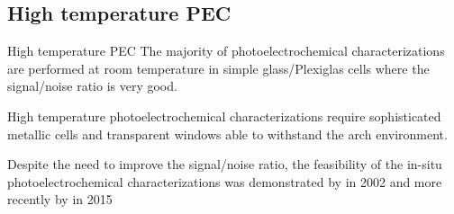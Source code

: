 \documentclass[10pt,compress,handout]{beamer}
\begin{document}
\subsection{High temperature PEC}
    \begin{frame}[allowframebreaks=1.0]{High temperature PEC}
        The majority of photoelectrochemical characterizations are performed at 
        room temperature in simple glass/Plexiglas cells where the signal/noise 
        ratio is very good.
        
        High temperature photoelectrochemical characterizations 
        require sophisticated metallic cells and transparent windows 
        able to withstand the arch environment. 
        
        Despite the need to improve the signal/noise ratio, the feasibility of 
        the in-situ photoelectrochemical characterizations was demonstrated by 
        \citet{bojinov2002} in 2002 and more recently by \citet{skocic2016} in 2015 


\end{frame}
\end{document}
